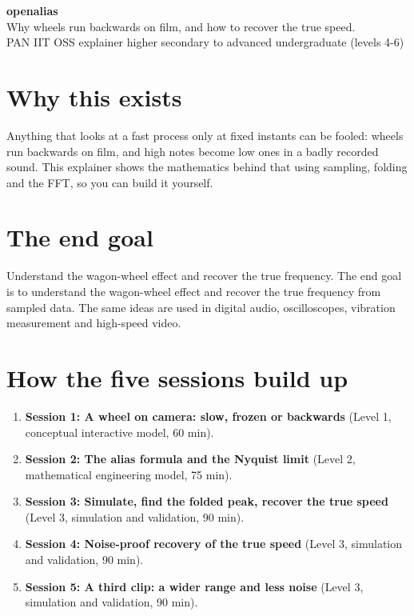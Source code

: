 \documentclass[11pt,a4paper]{article}
\begin{document}
\begin{center}{\LARGE\bfseries openalias}\\[0.4em]{\large Why wheels run backwards on film, and how to recover the true speed.}\\[0.2em]\small PAN IIT OSS explainer \textbullet{} higher secondary to advanced undergraduate (levels 4-6)\end{center}

\section*{Why this exists}
Anything that looks at a fast process only at fixed instants can be fooled: wheels run backwards on film, and high notes become low ones in a badly recorded sound. This explainer shows the mathematics behind that using sampling, folding and the FFT, so you can build it yourself.

\section*{The end goal}
Understand the wagon-wheel effect and recover the true frequency. The end goal is to understand the wagon-wheel effect and recover the true frequency from sampled data. The same ideas are used in digital audio, oscilloscopes, vibration measurement and high-speed video.

\section*{How the five sessions build up}
\begin{enumerate}[nosep]
\item \textbf{Session 1: A wheel on camera: slow, frozen or backwards} (Level 1, conceptual interactive model, 60 min).
\item \textbf{Session 2: The alias formula and the Nyquist limit} (Level 2, mathematical engineering model, 75 min).
\item \textbf{Session 3: Simulate, find the folded peak, recover the true speed} (Level 3, simulation and validation, 90 min).
\item \textbf{Session 4: Noise-proof recovery of the true speed} (Level 3, simulation and validation, 90 min).
\item \textbf{Session 5: A third clip: a wider range and less noise} (Level 3, simulation and validation, 90 min).
\end{enumerate}
\end{document}
